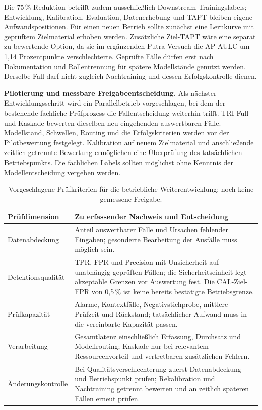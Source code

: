 Die 75\,\% Reduktion betrifft zudem ausschließlich Downstream-Trainingslabels;
Entwicklung, Kalibration, Evaluation, Datenerhebung und TAPT bleiben eigene
Aufwandspositionen. Für einen neuen Betrieb sollte zunächst eine Lernkurve mit geprüftem
Zielmaterial erhoben werden. Zusätzliche Ziel-TAPT wäre eine separat zu bewertende Option,
da sie im ergänzenden Putra-Versuch die AP-AULC um 1,14 Prozentpunkte verschlechterte.
Geprüfte Fälle dürfen erst nach Dokumentation und Rollentrennung für spätere Modellstände
genutzt werden. Derselbe Fall darf nicht zugleich Nachtraining und dessen Erfolgskontrolle dienen.

\textbf{Pilotierung und messbare Freigabeentscheidung.}
Als nächster Entwicklungsschritt wird ein Parallelbetrieb vorgeschlagen, bei dem der
bestehende fachliche Prüfprozess die Fallentscheidung weiterhin trifft. TRI Full und
Kaskade bewerten dieselben neu eingehenden auswertbaren Fälle. Modellstand, Schwellen,
Routing und die Erfolgskriterien werden vor der Pilotbewertung festgelegt.
Kalibration auf neuem Zielmaterial und anschließende zeitlich getrennte Bewertung
ermöglichen eine Überprüfung des tatsächlichen Betriebspunkts. Die fachlichen Labels
sollten möglichst ohne Kenntnis der Modellentscheidung vergeben werden.

\begin{table}[H]
\centering
\caption{Vorgeschlagene Prüfkriterien für die betriebliche Weiterentwicklung; noch keine gemessene Freigabe.}
\label{tab:business_pilot}
\small
\begin{tabular}{p{3.0cm}p{10.9cm}}
\toprule
Prüfdimension & Zu erfassender Nachweis und Entscheidung \\
\midrule
Datenabdeckung & Anteil auswertbarer Fälle und Ursachen fehlender Eingaben; gesonderte Bearbeitung der Ausfälle muss möglich sein. \\
Detektionsqualität & TPR, FPR und Precision mit Unsicherheit auf unabhängig geprüften Fällen; die Sicherheitseinheit legt akzeptable Grenzen vor Auswertung fest. Die CAL-Ziel-FPR von 0,5\,\% ist keine bereits bestätigte Betriebsgrenze. \\
Prüfkapazität & Alarme, Kontextfälle, Negativstichprobe, mittlere Prüfzeit und Rückstand; tatsächlicher Aufwand muss in die vereinbarte Kapazität passen. \\
Verarbeitung & Gesamtlatenz einschließlich Erfassung, Durchsatz und Modellrouting; Kaskade nur bei relevantem Ressourcenvorteil und vertretbaren zusätzlichen Fehlern. \\
Änderungskontrolle & Bei Qualitätsverschlechterung zuerst Datenabdeckung und Betriebspunkt prüfen; Rekalibration und Nachtraining getrennt bewerten und an zeitlich späteren Fällen erneut prüfen. \\
\bottomrule
\end{tabular}
\end{table}


